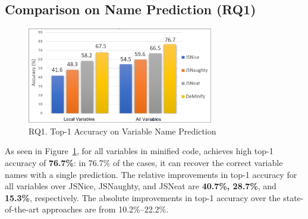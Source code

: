 \subsection{{\bf Comparison on Name Prediction (RQ1)}}
\label{empirical-rq1}


\begin{figure}[t] %
\begin{center}
\includegraphics[width=3.2in]{figures/name-prediction-result-2}
\vspace{-8pt}
\caption{RQ1. Top-1 Accuracy on Variable Name Prediction}
\label{name-prediction-result}
\end{center}
\end{figure}





As seen in Figure~\ref{name-prediction-result}, for all variables in
minified code, {\tool} achieves high top-1 accuracy of {\bf 76.7\%}:
in 76.7\% of the cases, it can recover the correct variable names with
a single prediction. The relative improvements in top-1 accuracy for
all variables over JSNice, JSNaughty, and JSNeat are {\bf 40.7\%,
  28.7\%}, and {\bf 15.3\%}, respectively. The absolute improvements
in top-1 accuracy over the state-of-the-art approaches are from
10.2\%--22.2\%.

